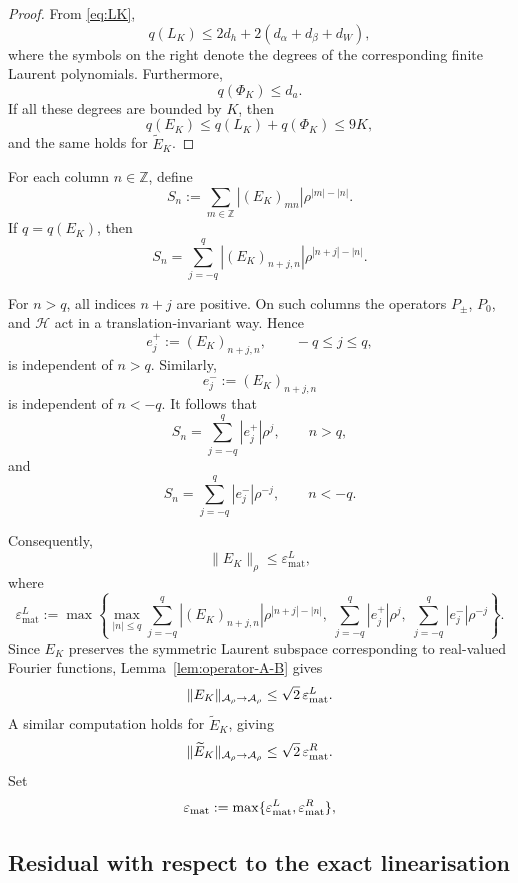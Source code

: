 \documentclass[11pt,a4paper]{amsart}
\begin{document}
\begin{proof}
	From \eqref{eq:LK},
	\[
	q(L_K)
	\le
	2d_h+2(d_\alpha+d_\beta+d_W),
	\]
	where the symbols on the right denote the degrees of the
	corresponding finite Laurent polynomials. Furthermore,
	\[
	q(\Phi_K)\le d_a.
	\]
	If all these degrees are bounded by $K$, then
	\[
	q(E_K)
	\le
	q(L_K)+q(\Phi_K)
	\le
	9K,
	\]
	and the same holds for $\widetilde{E}_K$.
\end{proof}
For each column $n\in\mathbb Z$, define
\[
S_n
:=
\sum_{m\in\mathbb Z}
|(E_K)_{mn}|
\rho^{|m|-|n|}.
\]
If $q=q(E_K)$, then
\[
S_n
=
\sum_{j=-q}^{q}
|(E_K)_{n+j,n}|
\rho^{|n+j|-|n|}.
\]

For $n>q$, all indices $n+j$ are positive. On such columns the
operators $P_\pm$, $P_0$, and $\mathcal H$ act in a
translation-invariant way. Hence
\[
e_j^+
:=
(E_K)_{n+j,n},
\qquad
-q\le j\le q,
\]
is independent of $n>q$. Similarly,
\[
e_j^-
:=
(E_K)_{n+j,n}
\]
is independent of $n<-q$. It follows that
\[
S_n
=
\sum_{j=-q}^{q}|e_j^+|\rho^j,
\qquad
n>q,
\]
and
\[
S_n
=
\sum_{j=-q}^{q}|e_j^-|\rho^{-j},
\qquad
n<-q.
\]

Consequently,
\begin{equation}\label{eq:matrixResidual}
	\|E_K\|_\rho
	\le
	\varepsilon^L_{\mathrm{mat}},
\end{equation}
where
\[
\varepsilon^L_{\mathrm{mat}}
:=
\max
\left\{
\max_{|n|\le q}
\sum_{j=-q}^{q}
|(E_K)_{n+j,n}|
\rho^{|n+j|-|n|},
\;
\sum_{j=-q}^{q}|e_j^+|\rho^j,
\;
\sum_{j=-q}^{q}|e_j^-|\rho^{-j}
\right\}.
\]
Since $E_K$ preserves the symmetric Laurent subspace corresponding to
real-valued Fourier functions, Lemma~\ref{lem:operator-A-B} gives
\begin{equation}\label{eq:matrixResidual-A}
	\|E_K\|_{\mathcal A_\rho\to\mathcal A_\rho}
	\le
	\sqrt2\,\varepsilon^L_{\rm mat}.
\end{equation}
A similar computation holds for $\widetilde{E}_K$, giving
\begin{equation}\label{eq:matrixResidual-B}
	\|\widetilde{E}_K\|_{\mathcal A_\rho\to\mathcal A_\rho}
	\le
	\sqrt2\,\varepsilon^R_{\rm mat}.
\end{equation}
Set
\[
\varepsilon_{\rm mat}
:=
\max\{\varepsilon^L_{\rm mat},
\varepsilon_{\rm mat}^{R}\},
\]


\subsection{Residual with respect to the exact linearisation}
\end{document}
